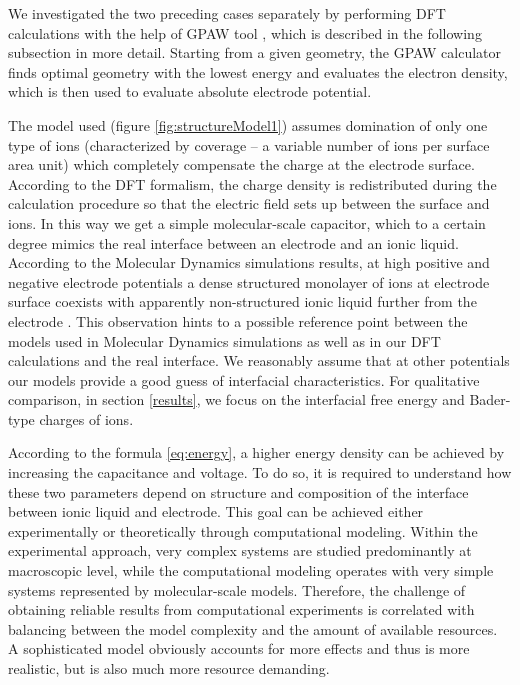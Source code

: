 \documentclass[a4paper,10pt]{article}
\begin{document}
We investigated the two preceding cases separately by performing DFT calculations with the help of GPAW tool \cite{GPAW,GPAW2}, which is described in the following subsection in more detail. Starting from a given geometry, the GPAW calculator finds optimal geometry with the lowest energy and evaluates the electron density, which is then used to evaluate absolute electrode potential. 

The model used (figure \ref{fig:structureModel1}) assumes domination of only one type of ions (characterized by coverage -- a variable number of ions per surface area unit) which completely compensate the charge at the electrode surface. According to the DFT formalism, the charge density is redistributed during the calculation procedure so that the electric field sets up between the surface and ions. In this way we get a simple molecular-scale capacitor, which to a certain degree mimics the real interface between an electrode and an ionic liquid. According to the Molecular Dynamics simulations results, at high positive and negative electrode potentials a dense structured monolayer of ions at electrode surface coexists with apparently non-structured ionic liquid further from the electrode \cite{Ivanistsev2014,Ivanistsev2015}. This observation hints to a possible reference point between the models used in Molecular Dynamics simulations as well as in our DFT calculations and the real interface. We reasonably assume that at other potentials our models provide a good guess of interfacial characteristics. For qualitative comparison, in section \ref{results}, we focus on the interfacial free energy and Bader-type charges of ions.

According to the formula \ref{eq:energy}, a higher energy density can be achieved by increasing the capacitance and voltage. To do so, it is required to understand how these two parameters depend on structure and composition of the interface between ionic liquid and electrode. This goal can be achieved either experimentally or theoretically through computational modeling. Within the experimental approach, very complex systems are studied predominantly at macroscopic level, while the computational modeling operates with very simple systems represented by molecular-scale models. Therefore, the challenge of obtaining reliable results from computational experiments is correlated with balancing between the model complexity and the amount of available resources. A sophisticated model obviously accounts for more effects and thus is more realistic, but is also much more resource demanding. 
\end{document}
